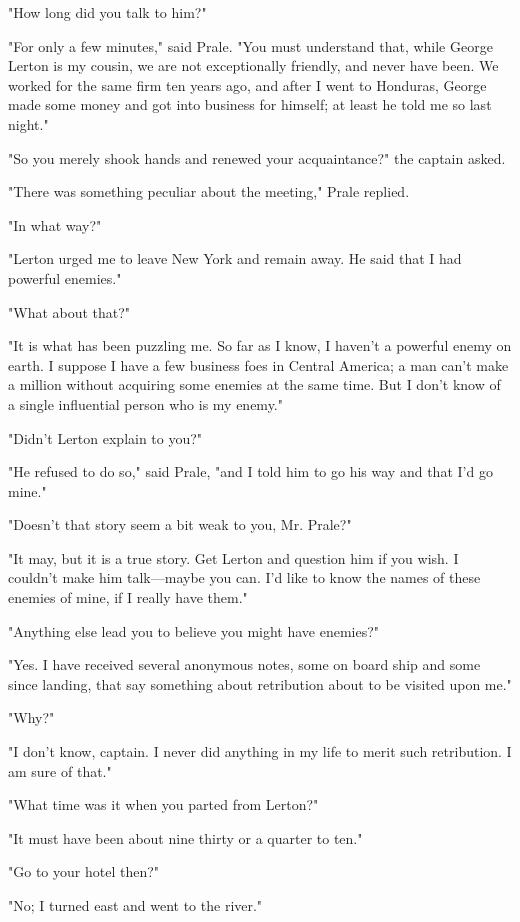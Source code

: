 \documentclass{novel}
\begin{document}
"How long did you talk to him?"

"For only a few minutes," said Prale. "You must understand that, while George Lerton is my cousin, we are not exceptionally friendly, and never have been. We worked for the same firm ten years ago, and after I went to Honduras, George made some money and got into business for himself; at least he told me so last night."

"So you merely shook hands and renewed your acquaintance?" the captain asked.

"There was something peculiar about the meeting," Prale replied.

"In what way?"

"Lerton urged me to leave New York and remain away. He said that I had powerful enemies."

"What about that?"

"It is what has been puzzling me. So far as I know, I haven't a powerful enemy on earth. I suppose I have a few business foes in Central America; a man can't make a million without acquiring some enemies at the same time. But I don't know of a single influential person who is my enemy."

"Didn't Lerton explain to you?"

"He refused to do so," said Prale, "and I told him to go his way and that I'd go mine."

"Doesn't that story seem a bit weak to you, Mr. Prale?"

"It may, but it is a true story. Get Lerton and question him if you wish. I couldn't make him talk---maybe you can. I'd like to know the names of these enemies of mine, if I really have them."

"Anything else lead you to believe you might have enemies?"

"Yes. I have received several anonymous notes, some on board ship and some since landing, that say something about retribution about to be visited upon me."

"Why?"

"I don't know, captain. I never did anything in my life to merit such retribution. I am sure of that."

"What time was it when you parted from Lerton?"

"It must have been about nine thirty or a quarter to ten."

"Go to your hotel then?"

"No; I turned east and went to the river."
\end{document}
